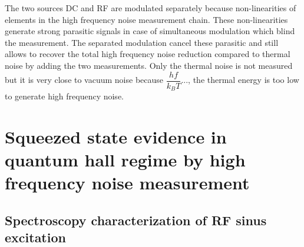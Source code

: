 The two sources DC and RF are modulated separately because non-linearities of elements in the high frequency noise measurement chain.
These non-linearities generate strong parasitic signals in case of simultaneous modulation which blind the measurement.
The separated modulation cancel these parasitic and still allows to recover the total high frequency noise reduction compared to thermal noise by adding the two measurements.
Only the thermal noise is not measured but it is very close to vacuum noise because $\dfrac{hf}{k_{B}T} ...$, the thermal energy is too low to generate high frequency noise.

\section{Squeezed state evidence in quantum hall regime by high frequency noise measurement}

\subsection{Spectroscopy characterization of RF sinus excitation}

